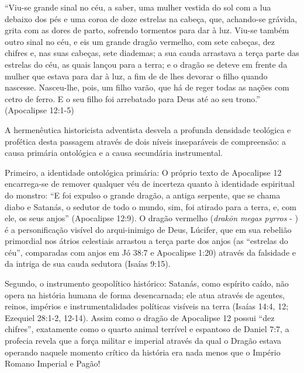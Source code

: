 ``Viu-se grande sinal no céu, a saber, uma mulher vestida do sol com a lua debaixo dos pés e uma coroa de doze estrelas na cabeça, que, achando-se grávida, grita com as dores de parto, sofrendo tormentos para dar à luz. Viu-se também outro sinal no céu, e eis um grande dragão vermelho, com sete cabeças, dez chifres e, nas suas cabeças, sete diademas; a sua cauda arrastava a terça parte das estrelas do céu, as quais lançou para a terra; e o dragão se deteve em frente da mulher que estava para dar à luz, a fim de de lhes devorar o filho quando nascesse. Nasceu-lhe, pois, um filho varão, que há de reger todas as nações com cetro de ferro. E o seu filho foi arrebatado para Deus até ao seu trono.'' (Apocalipse 12:1-5)

A hermenêutica historicista adventista desvela a profunda densidade teológica e profética desta passagem através de dois níveis inseparáveis de compreensão: a causa primária ontológica e a causa secundária instrumental.

Primeiro, a identidade ontológica primária:
O próprio texto de Apocalipse 12 encarrega-se de remover qualquer véu de incerteza quanto à identidade espiritual do monstro: ``E foi expulso o grande dragão, a antiga serpente, que se chama diabo e Satanás, o sedutor de todo o mundo, sim, foi atirado para a terra, e, com ele, os seus anjos'' (Apocalipse 12:9). O dragão vermelho (\textit{drakōn megas pyrros} - ) é a personificação visível do arqui-inimigo de Deus, Lúcifer, que em sua rebelião primordial nos átrios celestiais arrastou a terça parte dos anjos (as ``estrelas do céu'', comparadas com anjos em Jó 38:7 e Apocalipse 1:20) através da falsidade e da intriga de sua cauda sedutora (Isaías 9:15).

Segundo, o instrumento geopolítico histórico:
Satanás, como espírito caído, não opera na história humana de forma desencarnada; ele atua através de agentes, reinos, impérios e instrumentalidades políticas visíveis na terra (Isaías 14:4, 12; Ezequiel 28:1-2, 12-14).
Assim como o dragão de Apocalipse 12 possui ``dez chifres'', exatamente como o quarto animal terrível e espantoso de Daniel 7:7, a profecia revela que a força militar e imperial através da qual o Dragão estava operando naquele momento crítico da história era nada menos que o Império Romano Imperial e Pagão!

